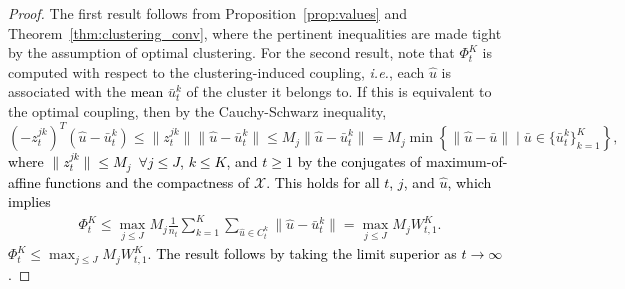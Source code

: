 \documentclass[12pt]{article}
\newcommand{\ie}{{\it i.e.}}
\newcommand{\unc}{u}
\newcommand{\ld}{W}
\newcommand{\RC}[1]{\textcolor{black}{#1}}
\newcommand{\RC}[1]{\textcolor{blue}{#1}}
\begin{document}
\begin{proof}
 The first result follows from Proposition~\ref{prop:values} and Theorem~\ref{thm:clustering_conv}, where the pertinent inequalities are made tight by the assumption of optimal clustering.
For the second result, note that $\Phi^K_t$ is computed with respect to the clustering-induced coupling, \ie, each $\hat{u}$ is associated with the \RC{mean} $\bar{u}^k_t$ of the cluster it belongs to. If this is equivalent to the optimal coupling, then by the Cauchy-Schwarz inequality,
\begin{equation*}(-z^{jk}_t)^T (\hat{u} - \bar{u}^k_t) \leq \|z^{jk}_t\|\|\hat{u}- \bar{u}^k_t\|\leq M_j\|\hat{u} - \bar{u}^k_t\| =  M_j \min \left \{\|\hat{u} - \bar{u}\|\mid \bar{u} \in \{\bar{u}^k_t\}_{k=1}^K \right\} ,\end{equation*}
\RC{where $\|z^{jk}_t\|\leq M_j$~$\forall j\leq J$, $k\leq K$, and $t\geq1$ by the conjugates of maximum-of-affine functions and the compactness of $\mathcal{X}$. This holds for all $t$, $j$, and $\hat{u}$, which implies}
\ifpreprint
\begin{equation*}
    \begin{aligned}
\Phi^K_t \leq \max_{j\leq J} M_j\frac{1}{n_t}\sum_{k=1}^{K}\sum_{\hat{\unc} \in C^k_t}\|\hat{u} - \bar{u}^k_t\|  = \max_{j\leq J}M_j\ld^K_{t,1}.
    \end{aligned}
\end{equation*}\else $\Phi^K_t \leq \max_{j\leq J}M_j\ld^K_{t,1}$. \fi
\RC{The result follows by taking the limit superior as $t \to \infty$.}
\end{proof}
\end{document}
